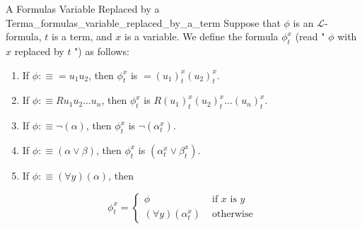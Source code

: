 \begin{definition}{A Formulas Variable Replaced by a Term}{a_formulas_variable_replaced_by_a_term}
Suppose that $\phi$ is an $\mathcal{L}$-formula, $t$ is a term, and $x$ is a variable. We define the formula $\phi_{t}^{x}$ (read " $\phi$ with $x$ replaced by $t$ ") as follows:
\begin{enumerate}
    \item If $\phi: \equiv=u_{1} u_{2}$, then $\phi_{t}^{x}$ is $=\left(u_{1}\right)_{t}^{x}\left(u_{2}\right)_{t}^{x}$.
    \item If $\phi: \equiv R u_{1} u_{2} \ldots u_{n}$, then $\phi_{t}^{x}$ is $R\left(u_{1}\right)_{t}^{x}\left(u_{2}\right)_{t}^{x} \ldots\left(u_{n}\right)_{t}^{x}$.
    \item If $\phi: \equiv \neg(\alpha)$, then $\phi_{t}^{x}$ is $\neg\left(\alpha_{t}^{x}\right)$.
    \item If $\phi: \equiv(\alpha \vee \beta)$, then $\phi_{t}^{x}$ is $\left(\alpha_{t}^{x} \vee \beta_{t}^{x}\right)$.
    \item If $\phi: \equiv(\forall y)(\alpha)$, then
\end{enumerate}
$$
\phi_{t}^{x}= \begin{cases}\phi & \text { if } x \text { is } y \\ (\forall y)\left(\alpha_{t}^{x}\right) & \text { otherwise }\end{cases}
$$
\end{definition}
